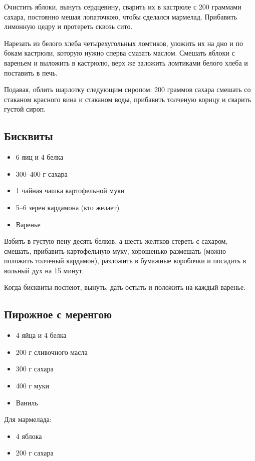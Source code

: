 Очистить яблоки, вынуть сердцевину, сварить их в кастрюле с 200 граммами сахара, постоянно мешая лопаточкою, чтобы сделался мармелад. Прибавить лимонную цедру и протереть сквозь сито.

Нарезать из белого хлеба четырехугольных ломтиков, уложить их на дно и по бокам кастрюли, которую нужно сперва смазать маслом. Смешать яблоки с вареньем и выложить в кастрюлю, верх же заложить ломтиками белого хлеба и поставить в печь.

Подавая, облить шарлотку следующим сиропом: 200 граммов сахара смешать со стаканом красного вина и стаканом воды, прибавить толченую корицу и сварить густой сироп.

\subsection{Бисквиты}

\begin{itemize}
	\item 6 яиц и 4 белка
    \item 300–400 г сахара 
    \item 1 чайная чашка картофельной муки 
    \item 5–6 зерен кардамона (кто желает) 
    \item Варенье
\end{itemize}

Взбить в густую пену десять белков, а шесть желтков стереть с сахаром, смешать, прибавить картофельную муку, хорошенько размешать (можно положить толченый кардамон), разложить в бумажные коробочки и посадить в вольный дух на 15 минут.

Когда бисквиты поспеют, вынуть, дать остыть и положить на каждый варенье.

\subsection{Пирожное с меренгою}

\begin{itemize}
	\item 4 яйца и 4 белка
    \item 200 г сливочного масла
    \item 300 г сахара 
    \item 400 г муки 
    \item Ваниль 
\end{itemize}
    
Для мармелада:

\begin{itemize}
	\item 4 яблока 
    \item 200 г сахара
\end{itemize}

